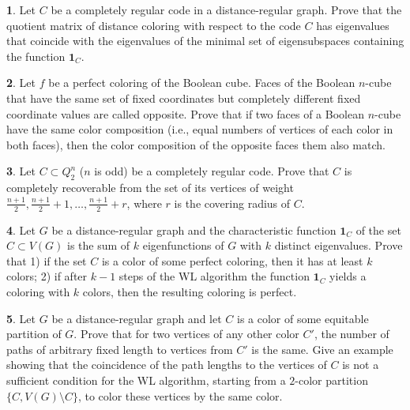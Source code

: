 \documentclass[11pt]{article}
\theoremstyle{definition}
\newtheorem{exercise}{\quad}
\begin{document}
{{\begin{exercise}
Let $C$ be a completely regular code in a distance-regular
graph. Prove that the quotient matrix of distance coloring 
with respect to the code $C$ has eigenvalues that coincide with
the eigenvalues of the minimal set of eigensubspaces
containing the function ${\mathbf 1}_C$.
\end{exercise}

{
\begin{exercise}
Let $f$ be a perfect coloring of the Boolean cube. Faces of the Boolean $n$-cube
that have the same set of fixed coordinates but completely different
fixed coordinate values are called opposite.
Prove that if two faces of a Boolean $n$-cube have the same color composition
(i.e.,  equal numbers of vertices of each color in both faces), then
the color composition of the opposite  faces  them also match.
\end{exercise} }

{
\begin{exercise}
Let $C\subset Q^n_2$ ($n$ is odd) be a completely regular
code. Prove that  $C$ is completely recoverable from the set
of its vertices of weight $\frac{n+1}{2}, \frac{n+1}{2}+1,\dots,
\frac{n+1}{2}+r$, where $r$ is the covering radius of $C$.
\end{exercise} }

\begin{exercise}
Let $G$ be a distance-regular graph and the characteristic
function ${\mathbf 1}_{C}$ of the set $C\subset V(G)$ is
the sum of $k$ eigenfunctions of $G$ with $k$ distinct
eigenvalues. Prove that 1) if the set $C$
is a color of some perfect coloring, then it has at least
$k$ colors; 2) if after $k-1$ steps of the WL algorithm
the function ${\mathbf 1}_{C}$ yields a coloring with $k$ colors, then
the resulting coloring is perfect. \end{exercise}

\begin{exercise}
Let $G$ be a distance-regular graph and let $C$ is a color of some equitable partition of $G$.
Prove that for two vertices of any other color $C'$, the number of paths
of arbitrary fixed length to vertices from $C'$
is the same. Give an example showing that the coincidence of the path lengths
to the vertices of $C$ is not a sufficient condition for the WL algorithm, starting from a $2$-color partition 
$\{C,V(G)\setminus C\}$, to color these vertices by the same color.
\end{exercise}


}}
\end{document}
